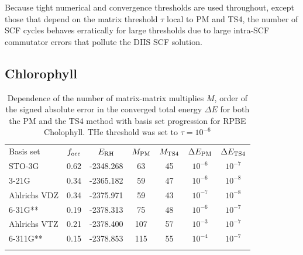 \commentoutA{\documentclass[prb,aps,twocolumn,twocolumngrid,secnumarabic,superbib,hyperref]{revtex4}}
\begin{document}
{Because tight numerical and convergence thresholds are used throughout, 
except those that depend on the matrix threshold $\tau$ local to {\sc PM} and {\sc TS4},
the number of SCF cycles behaves erratically for large thresholds due to large intra-SCF 
commutator errors that pollute the DIIS SCF solution.  

\subsection{Chlorophyll}


\begin{table}
\caption{Dependence of the number of matrix-matrix multiplies $M$, order of the signed absolute 
error in the converged total energy $\Delta E$ for both the PM and the TS4 method with basis set 
progression for RPBE Cholophyll. THe threshold was set to $\tau = 10^{-6}$}
\label{ChlorophyllConvergence}
\squeezetable
\begin{tabular}{lcccccc}
\toprule
Basis set       &  $f_{\rm occ}$ & $E_{\rm RH}$       &$M_{\rm PM}$&$M_{\rm TS4}$& $\Delta E_{\rm PM}$ & $\Delta E_{\rm TS4}$ \\
\colrule
STO-3G          &  0.62      & -2348.268  & 63      & 45       & $ 10^{-6}$   &  $ 10^{-7}$   \\ 
3-21G           &  0.34	     & -2365.182  & 59      & 47       & $ 10^{-6}$   &  $ 10^{-8}$   \\
Ahlrichs VDZ    &  0.34      & -2375.971  & 59      & 43       & $ 10^{-7}$   &  $ 10^{-8}$   \\
6-31G**         &  0.19      & -2378.313  & 75      & 48       & $ 10^{-6}$   &  $ 10^{-7}$   \\
Ahlrichs VTZ    &  0.21      & -2378.400  & 107     & 57       & $ 10^{-3}$   &  $ 10^{-7}$   \\
6-311G**        &  0.15      & -2378.853  & 115     & 55       & $ 10^{-4}$   &  $ 10^{-7}$   \\
\botrule
\end{tabular}
\end{table}

}
\end{document}

